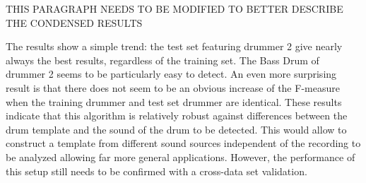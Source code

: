 \documentclass{article}
\begin{document}

THIS PARAGRAPH NEEDS TO BE MODIFIED TO BETTER DESCRIBE THE CONDENSED RESULTS

The results show a simple trend: the test set featuring drummer 2 give nearly always the best results, regardless of the training set. The Bass Drum of drummer 2 seems to be particularly easy to detect. An even more surprising result is that there does not seem to be an obvious increase of the F-measure when the training drummer and test set drummer are identical.
These results indicate that this algorithm is relatively robust against differences between the drum template and the sound of the drum to be detected. This would allow to construct a template from different sound sources independent of the recording to be analyzed allowing far more general applications. However, the performance of this setup still needs to be confirmed with a cross-data set validation.
\end{document}
